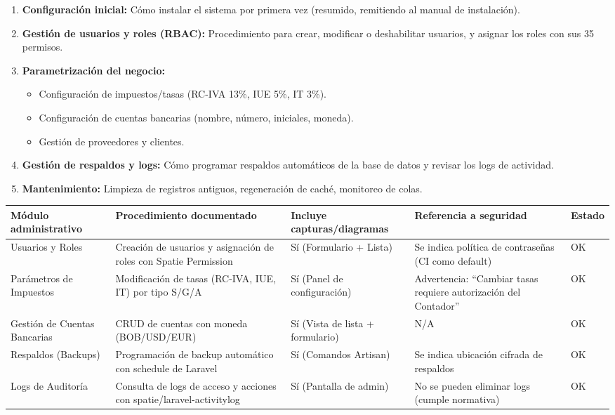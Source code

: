 \documentclass[stu]{apa7}
\begin{document}
\begin{enumerate}
    \item \textbf{Configuración inicial:} Cómo instalar el sistema por primera vez (resumido, remitiendo al manual de instalación).
    \item \textbf{Gestión de usuarios y roles (RBAC):} Procedimiento para crear, modificar o deshabilitar usuarios, y asignar los roles con sus 35 permisos.
    \item \textbf{Parametrización del negocio:}
    \begin{itemize}
        \item Configuración de impuestos/tasas (RC-IVA 13\%, IUE 5\%, IT 3\%).
        \item Configuración de cuentas bancarias (nombre, número, iniciales, moneda).
        \item Gestión de proveedores y clientes.
    \end{itemize}
    \item \textbf{Gestión de respaldos y logs:} Cómo programar respaldos automáticos de la base de datos y revisar los logs de actividad.
    \item \textbf{Mantenimiento:} Limpieza de registros antiguos, regeneración de caché, monitoreo de colas.
\end{enumerate}

\begin{longtable}{|L{3.5cm}|C{2.5cm}|C{2.5cm}|C{2.5cm}|C{1.5cm}|}
\hline
{}
\textbf{Módulo administrativo} & \textbf{Procedimiento documentado} & \textbf{Incluye capturas/diagramas} & \textbf{Referencia a seguridad} & \textbf{Estado} \\
\hline
Usuarios y Roles & Creación de usuarios y asignación de roles con Spatie Permission & Sí (Formulario + Lista) & Se indica política de contraseñas (CI como default) & OK \\
\hline
Parámetros de Impuestos & Modificación de tasas (RC-IVA, IUE, IT) por tipo S/G/A & Sí (Panel de configuración) & Advertencia: ``Cambiar tasas requiere autorización del Contador'' & OK \\
\hline
Gestión de Cuentas Bancarias & CRUD de cuentas con moneda (BOB/USD/EUR) & Sí (Vista de lista + formulario) & N/A & OK \\
\hline
Respaldos (Backups) & Programación de backup automático con schedule de Laravel & Sí (Comandos Artisan) & Se indica ubicación cifrada de respaldos & OK \\
\hline
Logs de Auditoría & Consulta de logs de acceso y acciones con spatie/laravel-activitylog & Sí (Pantalla de admin) & No se pueden eliminar logs (cumple normativa) & OK \\
\hline
\end{longtable}
\end{document}
